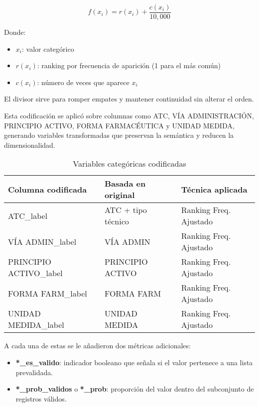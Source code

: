 \documentclass[conference]{IEEEtran}
\begin{document}
\begin{equation}
f(x_i) = r(x_i) + \frac{c(x_i)}{10{,}000}
\end{equation}

Donde:
\begin{itemize}
   \item $x_i$: valor categórico
   \item $r(x_i)$: ranking por frecuencia de aparición (1 para el más común)
   \item $c(x_i)$: número de veces que aparece $x_i$
\end{itemize}

El divisor sirve para romper empates y mantener continuidad sin alterar el orden.

Esta codificación se aplicó sobre columnas como ATC, VÍA ADMINISTRACIÓN, PRINCIPIO ACTIVO, FORMA FARMACÉUTICA y UNIDAD MEDIDA, generando variables transformadas que preservan la semántica y reducen la dimensionalidad.

\begin{table}[h]
    \caption{Variables categóricas codificadas}
\centering
\scriptsize
\begin{tabular}{|p{2.5cm}|p{2.3cm}|p{1.8cm}|}
\hline
\textbf{Columna codificada} & \textbf{Basada en original} & \textbf{Técnica aplicada} \\
\hline
ATC\_label & ATC + tipo técnico & Ranking Freq. Ajustado \\
\hline
VÍA ADMIN\_label & VÍA ADMIN & Ranking Freq. Ajustado \\
\hline
PRINCIPIO ACTIVO\_label & PRINCIPIO ACTIVO & Ranking Freq. Ajustado \\
\hline
FORMA FARM\_label & FORMA FARM & Ranking Freq. Ajustado \\
\hline
UNIDAD MEDIDA\_label & UNIDAD MEDIDA & Ranking Freq. Ajustado \\
\hline
\end{tabular}
\end{table}

A cada una de estas se le añadieron dos métricas adicionales:

\begin{itemize}
   \item \textbf{*\_es\_valido}: indicador booleano que señala si el valor pertenece a una lista prevalidada.
   \item \textbf{*\_prob\_validos} o \textbf{*\_prob}: proporción del valor dentro del subconjunto de registros válidos.
\end{itemize}
\end{document}
